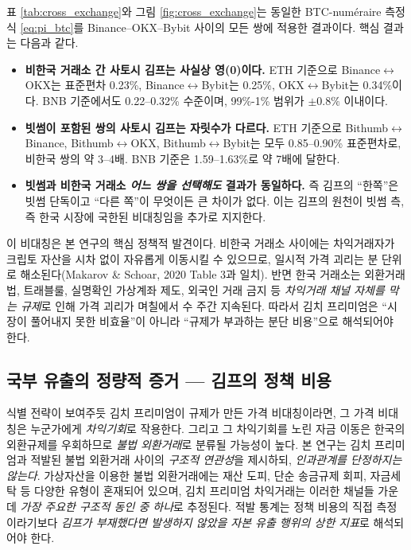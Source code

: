 \documentclass[11pt,a4paper]{article}
\begin{document}
표 \ref{tab:cross_exchange}와 그림 \ref{fig:cross_exchange}는 동일한 BTC-num\'eraire 측정식 \eqref{eq:pi_btc}를
Binance--OKX--Bybit 사이의 모든 쌍에 적용한 결과이다. 핵심 결과는 다음과 같다.
\begin{itemize}
\item \textbf{비한국 거래소 간 사토시 김프는 사실상 영(0)이다.} ETH 기준으로 Binance$\leftrightarrow$OKX는
표준편차 0.23\%, Binance$\leftrightarrow$Bybit는 0.25\%, OKX$\leftrightarrow$Bybit는 0.34\%이다. BNB 기준에서도
0.22--0.32\% 수준이며, 99\%-1\% 범위가 $\pm 0.8\%$ 이내이다.
\item \textbf{빗썸이 포함된 쌍의 사토시 김프는 자릿수가 다르다.} ETH 기준으로 Bithumb$\leftrightarrow$Binance,
Bithumb$\leftrightarrow$OKX, Bithumb$\leftrightarrow$Bybit는 모두 0.85--0.90\% 표준편차로, 비한국 쌍의 약 3--4배. BNB 기준은
1.59--1.63\%로 약 7배에 달한다.
\item \textbf{빗썸과 비한국 거래소 \emph{어느 쌍을 선택해도} 결과가 동일하다.} 즉 김프의 ``한쪽''은
빗썸 단독이고 ``다른 쪽''이 무엇이든 큰 차이가 없다. 이는 김프의 원천이 빗썸 측, 즉 한국 시장에
국한된 비대칭임을 추가로 지지한다.
\end{itemize}

이 비대칭은 본 연구의 핵심 정책적 발견이다. 비한국 거래소 사이에는 차익거래자가
크립토 자산을 시차 없이 자유롭게 이동시킬 수 있으므로, 일시적 가격 괴리는 분 단위로
해소된다(Makarov \& Schoar, 2020 Table 3과 일치). 반면 한국 거래소는 외환거래법,
트래블룰, 실명확인 가상계좌 제도, 외국인 거래 금지 등 \emph{차익거래 채널 자체를 막는
규제}로 인해 가격 괴리가 며칠에서 수 주간 지속된다. 따라서 김치 프리미엄은 ``시장이
풀어내지 못한 비효율''이 아니라 ``규제가 부과하는 분단 비용''으로 해석되어야 한다.

\subsection{국부 유출의 정량적 증거 --- 김프의 정책 비용}
\label{sec:policy}

식별 전략이 보여주듯 김치 프리미엄이 규제가 만든 가격 비대칭이라면, 그 가격 비대칭은
누군가에게 \emph{차익기회}로 작용한다. 그리고 그 차익기회를 노린 자금 이동은 한국의
외환규제를 우회하므로 \emph{불법 외환거래}로 분류될 가능성이 높다. 본 연구는
김치 프리미엄과 적발된 불법 외환거래 사이의 \emph{구조적 연관성}을 제시하되,
\emph{인과관계를 단정하지는 않는다}. 가상자산을 이용한 불법 외환거래에는 재산 도피,
단순 송금규제 회피, 자금세탁 등 다양한 유형이 혼재되어 있으며, 김치 프리미엄 차익거래는
이러한 채널들 가운데 \emph{가장 주요한 구조적 동인 중 하나}로 추정된다. 적발 통계는
정책 비용의 직접 측정이라기보다 \emph{김프가 부재했다면 발생하지 않았을 자본 유출 행위의
상한 지표}로 해석되어야 한다.
\end{document}
